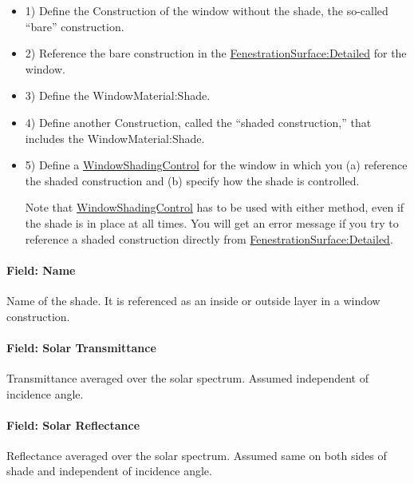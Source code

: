 \begin{itemize}

\item 1) Define the Construction of the window without the shade, the so-called ``bare'' construction.

\item 2) Reference the bare construction in the \hyperref[fenestrationsurfacedetailed]{FenestrationSurface:Detailed} for the window.

\item 3) Define the WindowMaterial:Shade.

\item 4) Define another Construction, called the ``shaded construction,'' that includes the WindowMaterial:Shade.

\item 5) Define a \hyperref[windowpropertyshadingcontrol]{WindowShadingControl} for the window in which you (a) reference the shaded construction and (b) specify how the shade is controlled.

Note that \hyperref[windowpropertyshadingcontrol]{WindowShadingControl} has to be used with either method, even if the shade is in place at all times. You will get an error message if you try to reference a shaded construction directly from \hyperref[fenestrationsurfacedetailed]{FenestrationSurface:Detailed}.

\end{itemize}

\paragraph{Field: Name}\label{field-name-16-009}

Name of the shade. It is referenced as an inside or outside layer in a window construction.

\paragraph{Field: Solar Transmittance}\label{field-solar-transmittance}

Transmittance averaged over the solar spectrum. Assumed independent of incidence angle.

\paragraph{Field: Solar Reflectance}\label{field-solar-reflectance}

Reflectance averaged over the solar spectrum. Assumed same on both sides of shade and independent of incidence angle.


